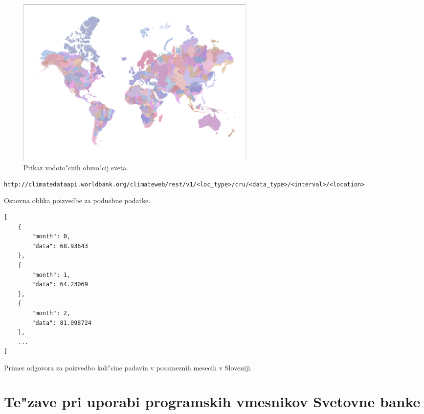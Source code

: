 \begin{figure}
\begin{center}
\includegraphics[width=12cm]{pic/climate_data_api_basins.pdf}
\end{center}
\caption{Prikaz vodoto"cnih obmo"cij sveta.}
\label{climate_data_api_basins}
\end{figure} 


\begin{snippet}
\begin{center}
\begin{lstlisting}
http://climatedataapi.worldbank.org/climateweb/rest/v1/<loc_type>/cru/<data_type>/<interval>/<location>
\end{lstlisting}
\end{center}
\caption{Osnovna oblika poizvedbe za podnebne podatke.}
\label{climate_dataset_request}
\end{snippet} 


\begin{snippet}
\begin{center}
\begin{lstlisting}
[
    {
        "month": 0,
        "data": 68.93643
    },
    {
        "month": 1,
        "data": 64.23069
    },
    {
        "month": 2,
        "data": 81.098724
    },
    ...
]
\end{lstlisting}
\end{center}
\caption{Primer odgovora za poizvedbo koli"cine padavin v posameznih mesecih v 
  Sloveniji.}
\label{climate_dataset_response}
\end{snippet} 






\section{Te"zave pri uporabi programskih vmesnikov Svetovne banke}


